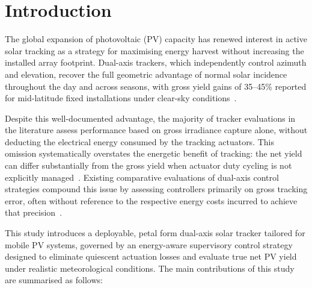 \documentclass[preprint,3p,12pt]{elsarticle}
\begin{document}
\section{Introduction}
\label{sec:intro}

The global expansion of photovoltaic (PV) capacity has renewed interest in active solar tracking as a strategy for maximising energy harvest without increasing the installed array footprint. Dual-axis trackers, which independently control azimuth and elevation, recover the full geometric advantage of normal solar incidence throughout the
day and across seasons, with gross yield gains of 35--45\% reported for mid-latitude fixed installations under clear-sky conditions~\cite{Eke2012, Abdallah2004}.

Despite this well-documented advantage, the majority of tracker evaluations in the literature assess performance based on gross irradiance capture alone, without deducting the electrical energy consumed by the tracking actuators. This omission systematically overstates the energetic benefit of tracking: the net yield can differ
substantially from the gross yield when actuator duty cycling is not explicitly managed~\cite{Tan2021}. Existing comparative evaluations of dual-axis control strategies compound this issue by assessing controllers primarily on gross tracking error, often without reference to the respective energy costs incurred to achieve that precision~\cite{Ontiveros2020}.

This study introduces a deployable, petal form dual-axis solar tracker tailored for mobile PV systems, governed by an energy-aware supervisory control strategy designed to eliminate quiescent actuation losses and evaluate true net PV yield under realistic meteorological conditions.
The main contributions of this study are summarised as follows:
\end{document}
